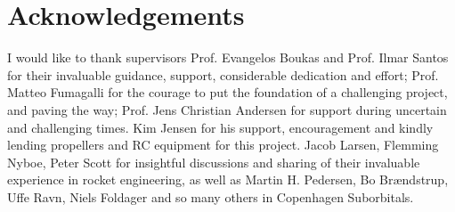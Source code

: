 \chapter{Acknowledgements}

I would like to thank supervisors Prof. Evangelos Boukas and Prof. Ilmar Santos for their invaluable guidance, support, considerable dedication and effort; Prof. Matteo Fumagalli for the courage to put the foundation of a challenging project, and paving the way; Prof. Jens Christian Andersen for support during uncertain and challenging times. 
Kim Jensen for his support, encouragement and kindly lending propellers and RC equipment for this project. 
Jacob Larsen, Flemming Nyboe, Peter Scott for insightful discussions and sharing of their invaluable experience in rocket engineering, as well as Martin H. Pedersen, Bo Brændstrup, Uffe Ravn, Niels Foldager and so many others in Copenhagen Suborbitals.


